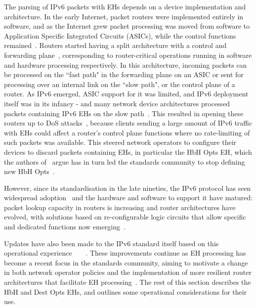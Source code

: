 \documentclass[conference]{IEEEtran}
\begin{document}
The parsing of IPv6 packets with EHs depends on a device implementation and
architecture. In the early Internet, packet routers were implemented entirely
in software, and as the Internet grew packet processing was moved from software
to Application Specific Integrated Circuits (ASICs), while the control
functions remained~\cite{router-architecture}. Routers started having a split
architecture with a control and forwarding plane~\cite{RFC3654}, corresponding
to router-critical operations running in software and hardware processing
respectively. In this architecture, incoming packets can be processed on the
``fast path" in the forwarding plane on an ASIC or sent for processing over an
internal link on the ``slow path", or the control plane of a router. As IPv6
emerged, ASIC support for it was limited, and IPv6 deployment itself was in its
infancy - and many network device architectures processed packets containing
IPv6 EHs on the slow path~\cite{ietf-v6ops-hbh-03}.  This resulted in opening
these routers up to DoS attacks~\cite{naagas2021deh}, because clients sending a
large amount of IPv6 traffic with EHs could affect a router's control plane
functions where no rate-limiting of such packets was available. This steered
network operators to configure their devices to discard packets containing EHs,
in particular the HbH Opts EH, which the authors of~\cite{ietf-v6ops-hbh-03}
argue has in turn led the standards community to stop defining new HbH
Opts~\cite{ietf-v6ops-hbh-03}.

However, since its standardisation in the late nineties, the IPv6 protocol has
seen widespread adoption~\cite{v6adoption_ton} and the hardware and software to
support it have matured: packet lookup capacity in routers is increasing and
router architectures have evolved, with solutions based on re-configurable
logic circuits that allow specific and dedicated functions now
emerging~\cite{cisco-silicon-one}.

Updates have also been made to the IPv6 standard itself based on this
operational
experience~\cite{RFC5722}~\cite{RFC6734}~\cite{RFC6564}~\cite{RFC8200}. These
improvements continue as EH processing has become a recent focus in the
standards community, aiming to motivate a change in both network operator
policies and the implementation of more resilient router architectures that
facilitate EH processing~\cite{ietf-6man-hbh-processing-06, ietf-v6ops-hbh-03,
ietf-6man-eh-limits-02}.  The rest of this section describes the HbH and Dest
Opts EHs, and outlines some operational considerations for their use.
\end{document}
